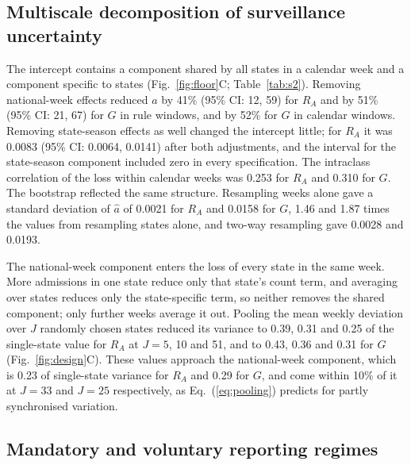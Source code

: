 \subsection{Multiscale decomposition of surveillance uncertainty}
\label{sec:res-multiscale}

The intercept contains a component shared by all states in a calendar week and a component specific to states (Fig.~\ref{fig:floor}C; Table~\ref{tab:s2}). Removing national-week effects reduced $a$ by 41\% (95\% CI: 12, 59) for $R_A$ and by 51\% (95\% CI: 21, 67) for $G$ in rule windows, and by 52\% for $G$ in calendar windows. Removing state-season effects as well changed the intercept little; for $R_A$ it was 0.0083 (95\% CI: 0.0064, 0.0141) after both adjustments, and the interval for the state-season component included zero in every specification. The intraclass correlation of the loss within calendar weeks was 0.253 for $R_A$ and 0.310 for $G$. The bootstrap reflected the same structure. Resampling weeks alone gave a standard deviation of $\hat{a}$ of 0.0021 for $R_A$ and 0.0158 for $G$, 1.46 and 1.87 times the values from resampling states alone, and two-way resampling gave 0.0028 and 0.0193.

The national-week component enters the loss of every state in the same week. More admissions in one state reduce only that state's count term, and averaging over states reduces only the state-specific term, so neither removes the shared component; only further weeks average it out. Pooling the mean weekly deviation over $J$ randomly chosen states reduced its variance to 0.39, 0.31 and 0.25 of the single-state value for $R_A$ at $J=5$, 10 and 51, and to 0.43, 0.36 and 0.31 for $G$ (Fig.~\ref{fig:design}C). These values approach the national-week component, which is 0.23 of single-state variance for $R_A$ and 0.29 for $G$, and come within 10\% of it at $J=33$ and $J=25$ respectively, as Eq.~(\ref{eq:pooling}) predicts for partly synchronised variation.

\subsection{Mandatory and voluntary reporting regimes}
\label{sec:res-reporting}

